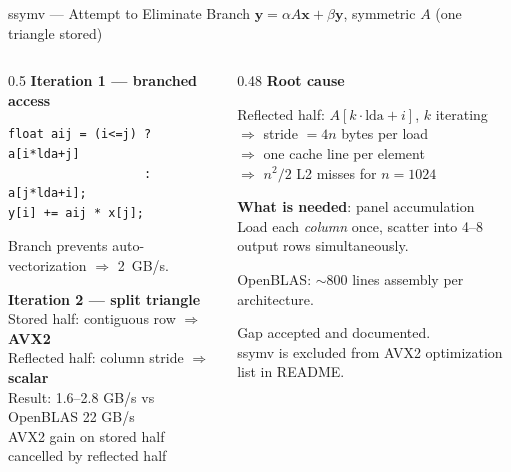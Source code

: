 \documentclass[aspectratio=169,10pt]{beamer}
\begin{document}
\begin{frame}[fragile]{ssymv --- Attempt to Eliminate Branch}
  $\mathbf{y} = \alpha A \mathbf{x} + \beta \mathbf{y}$, symmetric $A$ (one triangle stored)

  \begin{columns}[T]
    \begin{column}{0.5\textwidth}
      \textbf{Iteration 1 --- branched access}
      \begin{lstlisting}
float aij = (i<=j) ? a[i*lda+j]
                   : a[j*lda+i];
y[i] += aij * x[j];
      \end{lstlisting}
      Branch prevents auto-vectorization $\Rightarrow$ 2~GB/s.

      \medskip
      \textbf{Iteration 2 --- split triangle}\\
      Stored half: contiguous row $\Rightarrow$ \textbf{AVX2}\\
      Reflected half: column stride $\Rightarrow$ \textbf{scalar}\\[0.3em]
      \alert{Result}: 1.6--2.8 GB/s vs OpenBLAS 22 GB/s\\
      AVX2 gain on stored half cancelled by reflected half
    \end{column}
    \begin{column}{0.48\textwidth}
      \textbf{Root cause}

      Reflected half: $A[k \cdot \text{lda} + i]$, $k$ iterating\\
      $\Rightarrow$ stride $= 4n$ bytes per load\\
      $\Rightarrow$ one cache line per element\\
      $\Rightarrow$ $n^2/2$ L2 misses for $n=1024$

      \medskip
      \textbf{What is needed}: panel accumulation\\
      Load each \emph{column} once, scatter into 4--8 output rows simultaneously.

      \medskip
      OpenBLAS: $\sim$800 lines assembly per architecture.

      \vspace{0.3em}
      \alert{Gap accepted and documented.}\\
      ssymv is excluded from AVX2 optimization list in README.
    \end{column}
  \end{columns}
\end{frame}
\end{document}
